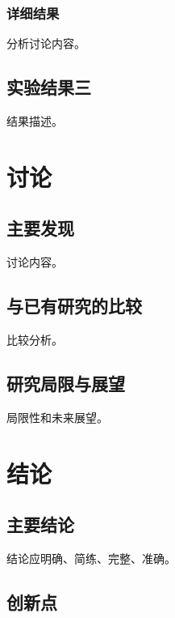 \documentclass[]{CAUthesis}
\begin{document}
\subsection{详细结果}

分析讨论内容。

\section{实验结果三}

结果描述。

\chapter{讨论}

\section{主要发现}

讨论内容。

\section{与已有研究的比较}

比较分析。

\section{研究局限与展望}

局限性和未来展望。

\chapter{结论}

\section{主要结论}

结论应明确、简练、完整、准确。

\section{创新点}
\end{document}
